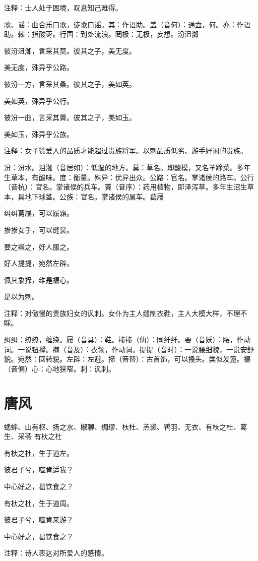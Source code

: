 \documentclass[12pt,UTF8]{ctexbook}
\begin{document}
注释：士人处于困境，叹息知己难得。

歌、谣：曲合乐曰歌，徒歌曰谣。其：作语助。盖（音何）：通盍，何。亦：作语助。棘：指酸枣。行国：到处流浪。罔极：无极，妄想。汾沮洳

彼汾沮洳，言采其莫。彼其之子，美无度。

美无度，殊异乎公路。

彼汾一方，言采其桑。彼其之子，美如英。

美如英，殊异乎公行。

彼汾一曲，言采其藚。彼其之子，美如玉。

美如玉，殊异乎公族。

注释：女子赞爱人的品质才能超过贵族将军。以刺品质低劣、游手好闲的贵族。

汾：汾水。沮洳（音居如）：低湿的地方。莫：草名。即酸模，又名羊蹄菜。多年生草本，有酸味。度：衡量。殊异：优异出众。公路：官名。掌诸侯的路车。公行（音杭）：官名。掌诸侯的兵车。藚（音序）：药用植物，即泽泻草。多年生沼生草本，具地下球茎。公族：官名。掌诸侯的属车。葛屦

纠纠葛屦，可以履霜。

掺掺女手，可以缝裳。

要之襋之，好人服之。

好人提提，宛然左辟。

佩其象揥，维是褊心。

是以为刺。

注释：对傲慢的贵族妇女的讽刺。女仆为主人缝制衣鞋，主人大模大样，不理不睬。

纠纠：缭缭，缠绕。屦（音具）：鞋。掺掺（仙）：同纤纤。要（音妖）：腰，作动词。一说钮襻。襋（音及）：衣领，作动词。提提（音时）：一说腰细貌，一说安舒貌。宛然：回转貌。左辟：左避。揥（音替）：古首饰，可以搔头。类似发篦。褊（音偏）心：心地狭窄。刺：讽刺。



\part{唐风}
蟋蟀、山有枢、扬之水、椒聊、绸缪、杕杜、羔裘、鸨羽、无衣、有杕之杜、葛生、采苓
有杕之杜

有杕之杜，生于道左。

彼君子兮，噬肯适我？

中心好之，曷饮食之？

有杕之杜，生于道周。

彼君子兮，噬肯来游？

中心好之，曷饮食之？

注释：诗人表达对所爱人的感情。
\end{document}
